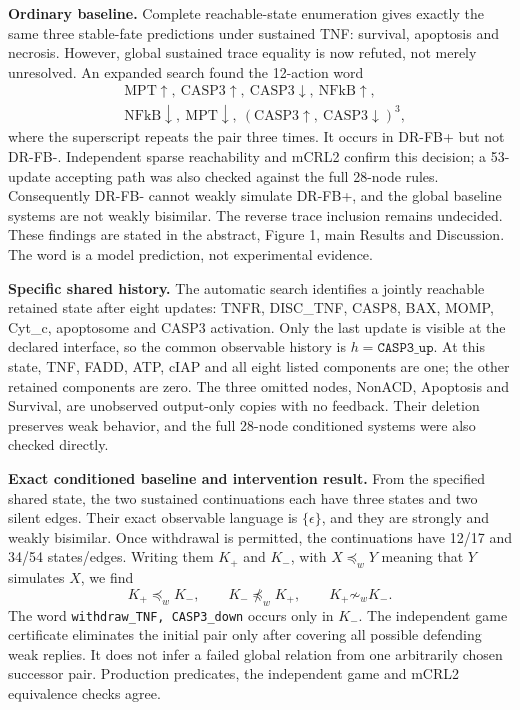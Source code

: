 \documentclass[11pt]{article}
\newcommand{\DRLocalMinusEdges}{54}
\newcommand{\DRLocalMinusStates}{34}
\newcommand{\DRLocalPlusEdges}{17}
\newcommand{\DRLocalPlusStates}{12}
\begin{document}
\textbf{Ordinary baseline.} Complete reachable-state enumeration gives exactly
the same three stable-fate predictions under sustained TNF: survival,
apoptosis and necrosis. However, global sustained trace equality is now
refuted, not merely unresolved. An expanded search found the 12-action word
\[
\begin{split}
&\mathrm{MPT}\!\uparrow,\ \mathrm{CASP3}\!\uparrow,\
\mathrm{CASP3}\!\downarrow,\ \mathrm{NFkB}\!\uparrow,\\
&\mathrm{NFkB}\!\downarrow,\ \mathrm{MPT}\!\downarrow,\
(\mathrm{CASP3}\!\uparrow,\ \mathrm{CASP3}\!\downarrow)^3,
\end{split}
\]
where the superscript repeats the pair three times. It occurs in DR-FB+
but not DR-FB-. Independent sparse reachability and mCRL2 confirm this
decision; a 53-update accepting path was also checked against the full
28-node rules. Consequently DR-FB- cannot weakly simulate DR-FB+, and the
global baseline systems are not weakly bisimilar. The reverse trace inclusion
remains undecided. These findings are stated in the abstract, Figure 1, main
Results and Discussion. The word is a model prediction, not experimental evidence.

\textbf{Specific shared history.} The automatic search identifies a jointly
reachable retained state after eight updates: TNFR, DISC\_TNF, CASP8, BAX,
MOMP, Cyt\_c, apoptosome and CASP3 activation. Only the last update is visible
at the declared interface, so the common observable history is
$h=\texttt{CASP3\_up}$. At this state, TNF, FADD, ATP, cIAP and all eight
listed components are one; the other retained components are zero.
The three omitted nodes, NonACD, Apoptosis and Survival, are unobserved
output-only copies with no feedback. Their deletion preserves weak behavior,
and the full 28-node conditioned systems were also checked directly.

\textbf{Exact conditioned baseline and intervention result.} From the
specified shared state, the two sustained continuations each have three
states and two silent edges. Their exact observable language is
$\{\epsilon\}$, and they are strongly and weakly bisimilar. Once withdrawal
is permitted, the continuations have \DRLocalPlusStates{}/\DRLocalPlusEdges{}
and \DRLocalMinusStates{}/\DRLocalMinusEdges{} states/edges. Writing them
$K_+$ and $K_-$, with $X\preceq_wY$ meaning that $Y$ simulates $X$, we find
\[
K_+\preceq_wK_-,\qquad K_-\not\preceq_wK_+,\qquad K_+\not\sim_wK_-.
\]
The word \texttt{withdraw\_TNF, CASP3\_down} occurs only in $K_-$. The
independent game certificate eliminates the initial pair only after covering
all possible defending weak replies. It does not infer a failed global
relation from one arbitrarily chosen successor pair. Production predicates,
the independent game and mCRL2 equivalence checks agree.
\end{document}
